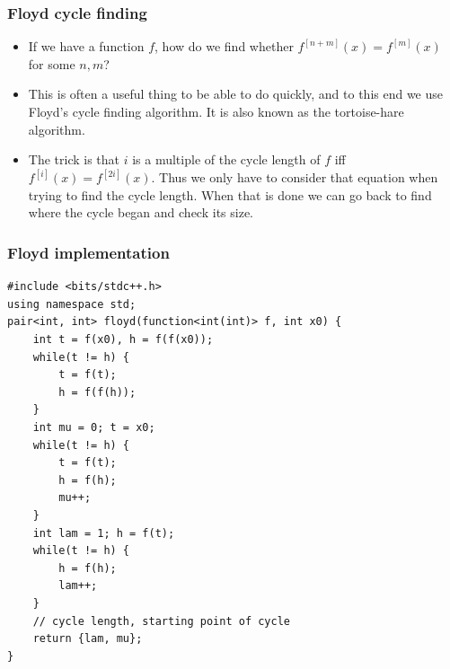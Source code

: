 \documentclass{beamer}
\begin{document}
\begin{frame}[plain]
\frametitle{Floyd cycle finding}

\begin{itemize}

\item If we have a function $f$, how do we find whether $f^{[n+m]}(x) = f^{[m]}(x)$ for some $n, m$?

\item This is often a useful thing to be able to do quickly, and to this end we use Floyd's cycle finding algorithm. It is also known as the tortoise-hare algorithm.

\item The trick is that $i$ is a multiple of the cycle length of $f$ iff  $f^{[i]}(x) = f^{[2i]}(x)$. Thus we only have to consider that equation when trying to find the cycle length. When that is done we can go back to find where the cycle began and check its size.

\end{itemize}

\end{frame}

\begin{frame}
\frametitle{Floyd implementation}

\begin{tiny}
\begin{verbatim}
#include <bits/stdc++.h>
using namespace std;
pair<int, int> floyd(function<int(int)> f, int x0) {
    int t = f(x0), h = f(f(x0));
    while(t != h) {
        t = f(t);
        h = f(f(h));
    }
    int mu = 0; t = x0;
    while(t != h) {
        t = f(t);
        h = f(h);
        mu++;
    }
    int lam = 1; h = f(t);
    while(t != h) {
        h = f(h);
        lam++;
    }
    // cycle length, starting point of cycle
    return {lam, mu};
}
\end{verbatim}
\end{tiny}

\end{frame}
\end{document}
